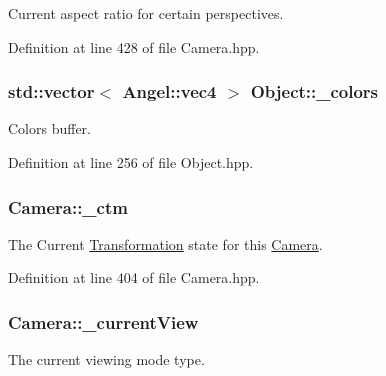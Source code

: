 Current aspect ratio for certain perspectives. 



Definition at line 428 of file Camera.\-hpp.

\hypertarget{class_object_a29a0e9959c490067db69378bf57a17ba}{
\subsubsection[{\-\_\-colors}]{\setlength{\rightskip}{0pt plus 5cm}std\-::vector$<$ {\bf Angel\-::vec4} $>$ Object\-::\-\_\-colors\hspace{0.3cm}{\ttfamily [inherited]}}}\label{class_object_a29a0e9959c490067db69378bf57a17ba}


Colors buffer. 



Definition at line 256 of file Object.\-hpp.

\hypertarget{class_camera_a6c1e31c8470b923f9f872f73597cb95b}{
\subsubsection[{\-\_\-ctm}]{ Camera\-::\-\_\-ctm\hspace{0.3cm}{\ttfamily [private]}}}\label{class_camera_a6c1e31c8470b923f9f872f73597cb95b}


The Current \hyperlink{class_transformation}{Transformation} state for this \hyperlink{class_camera}{Camera}. 



Definition at line 404 of file Camera.\-hpp.

\hypertarget{class_camera_ac9062d9bb891aa81d163076738451081}{
\subsubsection[{\-\_\-current\-View}]{ Camera\-::\-\_\-current\-View\hspace{0.3cm}{\ttfamily [private]}}}\label{class_camera_ac9062d9bb891aa81d163076738451081}


The current viewing mode type. 



